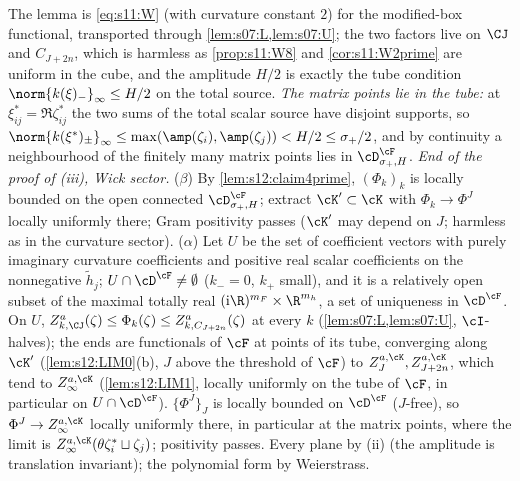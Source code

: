 The lemma is \eqref{eq:s11:W} (with curvature constant $2$) for the modified-box functional, transported through \cref{lem:s07:L,lem:s07:U}; the two factors live on $\CJ$ and $C_{J+2n}$, which is harmless as \cref{prop:s11:W8} and \cref{cor:s11:W2prime} are uniform in the cube, and the amplitude $H/2$ is exactly the tube condition $\norm{k(\xi)_-}_\infty\le H/2$ on the total source. \emph{The matrix points lie in the tube:} at $\xi^*_{ij}=\Re\zeta^*_{ij}$ the two sums of the total scalar source have disjoint supports, so $\norm{k(\xi^*)_\pm}_\infty\le\max(\amp(\zeta_i),\amp(\zeta_j))<H/2\le\sigma_+/2$, and by continuity a neighbourhood of the finitely many matrix points lies in $\cD^\cF_{\sigma_+,H}$. \emph{End of the proof of (iii), Wick sector.} ($\beta$) By \cref{lem:s12:claim4prime}, $(\Phi_k)_k$ is locally bounded on the open connected $\cD^\cF_{\sigma_+,H}$; extract $\cK'\subset\cK$ with $\Phi_k\to\Phi^J$ locally uniformly there; Gram positivity passes ($\cK'$ may depend on $J$; harmless as in the curvature sector). ($\alpha$) Let $U$ be the set of coefficient vectors with purely imaginary curvature coefficients and positive real scalar coefficients on the nonnegative $\tilde h_j$; $U\cap\cD^\cF\ne\emptyset$ ($k_-=0$, $k_+$ small), and it is a relatively open subset of the maximal totally real $(\mathrm i\R)^{m_F}\times\R^{m_h}$, a set of uniqueness in $\cD^\cF$. On $U$, $Z^a_{k,\CJ}(\zeta)\le\Phi_k(\zeta)\le Z^a_{k,C_{J+2n}}(\zeta)$ at every $k$ (\cref{lem:s07:L,lem:s07:U}, $\cI$-halves); the ends are functionals of $\cF$ at points of its tube, converging along $\cK'$ (\cref{lem:s12:LIM0}(b), $J$ above the threshold of $\cF$) to $Z^{a,\cK}_J,Z^{a,\cK}_{J+2n}$, which tend to $Z^{a,\cK}_\infty$ (\cref{lem:s12:LIM1}, locally uniformly on the tube of $\cF$, in particular on $U\cap\cD^\cF$). $\{\Phi^J\}_J$ is locally bounded on $\cD^\cF$ ($J$-free), so $\Phi^J\to Z^{a,\cK}_\infty$ locally uniformly there, in particular at the matrix points, where the limit is $Z^{a,\cK}_\infty(\theta\zeta^*_i\sqcup\zeta_j)$; positivity passes. Every plane by (ii) (the amplitude is translation invariant); the polynomial form by Weierstrass.

